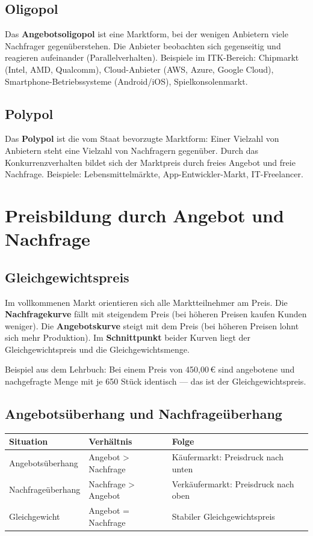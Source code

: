 \documentclass[11pt, a4paper]{article}
\begin{document}
\subsection{Oligopol}

Das \textbf{Angebotsoligopol} ist eine Marktform, bei der wenigen Anbietern viele Nachfrager
gegenüberstehen. Die Anbieter beobachten sich gegenseitig und reagieren aufeinander
(Parallelverhalten). Beispiele im ITK-Bereich: Chipmarkt (Intel, AMD, Qualcomm), Cloud-Anbieter
(AWS, Azure, Google Cloud), Smartphone-Betriebssysteme (Android/iOS), Spielkonsolenmarkt.

\subsection{Polypol}

Das \textbf{Polypol} ist die vom Staat bevorzugte Marktform: Einer Vielzahl von Anbietern
steht eine Vielzahl von Nachfragern gegenüber. Durch das Konkurrenzverhalten bildet sich
der Marktpreis durch freies Angebot und freie Nachfrage. Beispiele: Lebensmittelmärkte,
App-Entwickler-Markt, IT-Freelancer.

\section{Preisbildung durch Angebot und Nachfrage}

\subsection{Gleichgewichtspreis}

Im vollkommenen Markt orientieren sich alle Marktteilnehmer am Preis. Die
\textbf{Nachfragekurve} fällt mit steigendem Preis (bei höheren Preisen kaufen Kunden
weniger). Die \textbf{Angebotskurve} steigt mit dem Preis (bei höheren Preisen lohnt sich
mehr Produktion). Im \textbf{Schnittpunkt} beider Kurven liegt der Gleichgewichtspreis und
die Gleichgewichtsmenge.

Beispiel aus dem Lehrbuch: Bei einem Preis von 450,00\,€ sind angebotene und nachgefragte
Menge mit je 650 Stück identisch --- das ist der Gleichgewichtspreis.

\subsection{Angebotsüberhang und Nachfrageüberhang}

\begin{center}
\begin{tabular}{p{4.5cm} p{4cm} p{4.5cm}}
\toprule
\textbf{Situation} & \textbf{Verhältnis} & \textbf{Folge}\\
\midrule
Angebotsüberhang & Angebot > Nachfrage & Käufermarkt: Preisdruck nach unten\\
\addlinespace
Nachfrageüberhang & Nachfrage > Angebot & Verkäufermarkt: Preisdruck nach oben\\
\addlinespace
Gleichgewicht & Angebot = Nachfrage & Stabiler Gleichgewichtspreis\\
\bottomrule
\end{tabular}
\end{center}
\end{document}
